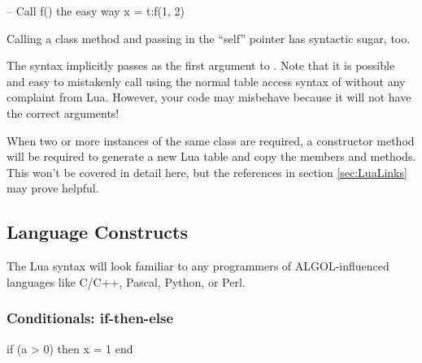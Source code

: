 \begin{lrbox}{\RightBoxB}
\begin{NestedLuaCode}[linewidth=2.5in]
-- Call f() the easy way
x = t:f(1, 2)
\end{NestedLuaCode}
\end{lrbox}

\begin{SideBySideGrid}

	\UseLuaCodeBox{\LeftBoxA} \NextColumn \UseLuaCodeBox{\RightBoxA}

\LastRow
\end{SideBySideGrid}

Calling a class method and passing in the ``self'' pointer has syntactic
sugar, too.

\begin{SideBySideGrid}

	\UseLuaCodeBox{\LeftBoxB} \NextColumn \UseLuaCodeBox{\RightBoxB}

\LastRow
\end{SideBySideGrid}

The syntax  implicitly passes  as the first argument
to .  Note that it is possible and easy to mistakenly call
 using the normal table access syntax of  without any
complaint from Lua.   However, your code may misbehave because it will not have
the correct arguments!

When two or more instances of the same class are required, a constructor method
will be required to generate a new Lua table and copy the members and methods.
This won't be covered in detail here, but the references in section
\ref{sec:LuaLinks} may prove helpful.

\subsection{Language Constructs}

The Lua syntax will look familiar to any programmers of ALGOL-influenced
languages like C/C++, Pascal, Python, or Perl.   

\subsubsection{Conditionals: if-then-else}

\begin{LuaCode}
if (a > 0) then
	x = 1
end
\end{LuaCode}

